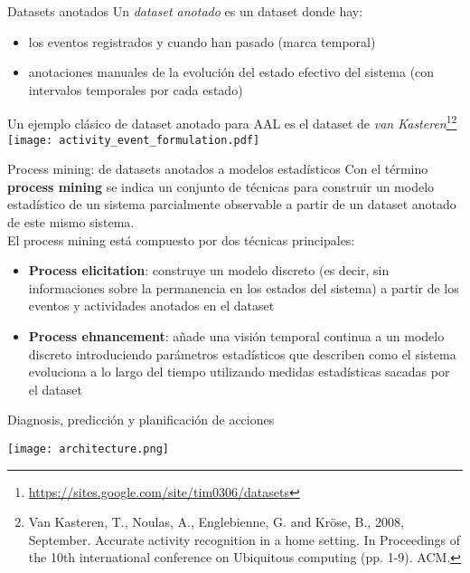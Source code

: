 \documentclass[9pt, handout]{beamer}
\begin{document}
    \begin{frame}{Datasets anotados}
      Un \textit{dataset anotado} es un dataset donde hay:
      \begin{itemize}
        \item los eventos registrados y cuando han pasado (marca temporal)
        \item anotaciones manuales de la evolución del estado efectivo del sistema (con intervalos temporales por cada estado)
      \end{itemize}
      Un ejemplo clásico de dataset anotado para AAL es el dataset de \textit{van Kasteren}\footnote{\url{https://sites.google.com/site/tim0306/datasets}}\footnote{Van Kasteren, T., Noulas, A., Englebienne, G. and Kröse, B., 2008, September. Accurate activity recognition in a home setting. In Proceedings of the 10th international conference on Ubiquitous computing (pp. 1-9). ACM.}\\[1em]
      
      \texttt{[image: activity\_event\_formulation.pdf]}
    \end{frame}
    
    \begin{frame}{Process mining: de datasets anotados a modelos estadísticos}
      Con el término \textbf{process mining} se indica un conjunto de técnicas para construir un modelo estadístico de un sistema parcialmente observable a partir de un dataset anotado de este mismo sistema.\\[1em]
      
      El process mining está compuesto por dos técnicas principales:
      \begin{itemize}
        \item \textbf{Process elicitation}: construye un modelo discreto (es decir, sin informaciones sobre la permanencia en los estados del sistema) a partir de los eventos y actividades anotados en el dataset
        \item \textbf{Process ehnancement}: añade una visión temporal continua a un modelo discreto introduciendo parámetros estadísticos que describen como el sistema evoluciona a lo largo del tiempo utilizando medidas estadísticas sacadas por el dataset
      \end{itemize}
    \end{frame}
  
    \begin{frame}{Diagnosis, predicción y planificación de acciones}
      \begin{center}
        \texttt{[image: architecture.png]}
      \end{center}
    \end{frame}
  
\end{document}
